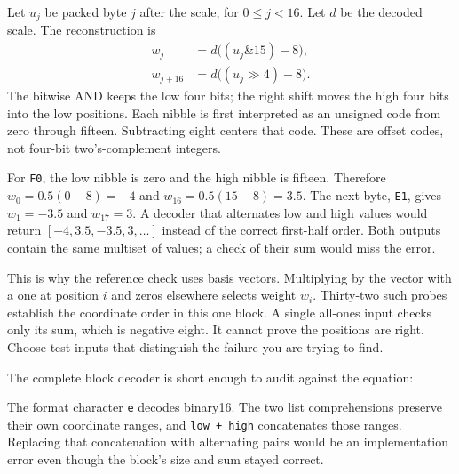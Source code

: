 
Let $u_j$ be packed byte $j$ after the scale, for $0\leq j<16$.
Let $d$ be the decoded scale. The reconstruction is
\begin{align}
w_j &= d\bigl((u_j \mathbin{\&} 15)-8\bigr),\\
w_{j+16} &= d\bigl((u_j \gg 4)-8\bigr).
\end{align}
The bitwise AND keeps the low four bits; the right shift moves
the high four bits into the low positions. Each nibble is first
interpreted as an unsigned code from zero through fifteen.
Subtracting eight centers that code. These are offset codes,
not four-bit two's-complement integers.

For \texttt{F0}, the low nibble is zero and the high nibble is
fifteen. Therefore $w_0=0.5(0-8)=-4$ and
$w_{16}=0.5(15-8)=3.5$. The next byte, \texttt{E1}, gives
$w_1=-3.5$ and $w_{17}=3$. A decoder that alternates low and
high values would return $[-4,3.5,-3.5,3,\ldots]$ instead of
the correct first-half order. Both outputs contain the same
multiset of values; a check of their sum would miss the error.

This is why the reference check uses basis vectors. Multiplying by
the vector with a one at position $i$ and zeros elsewhere selects
weight $w_i$. Thirty-two such probes establish the coordinate order
in this one block. A single all-ones input checks only its sum,
which is negative eight. It cannot prove the positions are right.
Choose test inputs that distinguish the failure you are trying to find.

The complete block decoder is short enough to audit against the equation:
\par\medskip\noindent\begin{minipage}{\linewidth}
\end{minipage}\par\medskip
The format character \texttt{e} decodes binary16. The two list
comprehensions preserve their own coordinate ranges, and
\texttt{low + high} concatenates those ranges. Replacing that
concatenation with alternating pairs would be an implementation error
even though the block's size and sum stayed correct.

